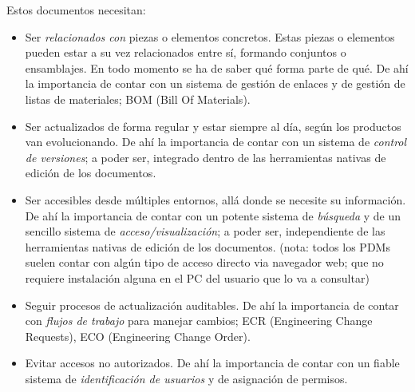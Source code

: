 \documentclass[spanish,12pt,a4paper,final,oneside]{book}
\begin{document}
Estos documentos necesitan:
\begin{itemize}

\item Ser \textit{relacionados con} piezas o elementos concretos. Estas piezas o elementos pueden estar a su vez relacionados entre sí, formando conjuntos o ensamblajes. En todo momento se ha de saber qué forma parte de qué. De ahí la importancia de contar con un sistema de gestión de enlaces y de gestión de listas de materiales; BOM (Bill Of Materials).

\item Ser actualizados de forma regular y estar siempre al día, según los productos van evolucionando. De ahí la importancia de contar con un sistema de \textit{control de versiones}; a poder ser, integrado dentro de las herramientas nativas de edición de los documentos.

\item Ser accesibles desde múltiples entornos, allá donde se necesite su información. De ahí la importancia de contar con un potente sistema de \textit{búsqueda} y de un sencillo sistema de \textit{acceso/visualización}; a poder ser, independiente de las herramientas nativas de edición de los documentos. (nota: todos los PDMs suelen contar con algún tipo de acceso directo via navegador web; que no requiere instalación alguna en el PC del usuario que lo va a consultar)

\item Seguir procesos de actualización auditables. De ahí la importancia de contar con \textit{flujos de trabajo} para manejar cambios; ECR (Engineering Change Requests), ECO (Engineering Change Order). 

\item Evitar accesos no autorizados. De ahí la importancia de contar con un fiable sistema de \textit{identificación de usuarios} y de asignación de permisos.

\end{itemize}
\end{document}
